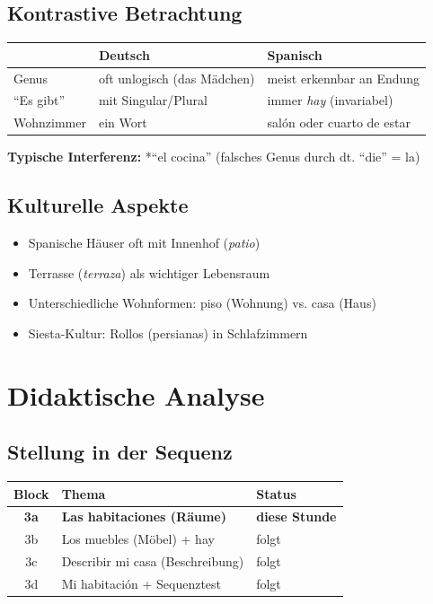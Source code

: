 \documentclass[11pt,a4paper]{article}
\begin{document}
\subsection{Kontrastive Betrachtung}

\begin{tabular}{|l|p{5cm}|p{5cm}|}
\hline
& \textbf{Deutsch} & \textbf{Spanisch} \\
\hline
Genus & oft unlogisch (das Mädchen) & meist erkennbar an Endung \\
\hline
``Es gibt'' & mit Singular/Plural & immer \textit{hay} (invariabel) \\
\hline
Wohnzimmer & ein Wort & salón oder cuarto de estar \\
\hline
\end{tabular}

\textbf{Typische Interferenz:} *``el cocina'' (falsches Genus durch dt. ``die'' = la)

\subsection{Kulturelle Aspekte}
\begin{itemize}
    \item Spanische Häuser oft mit Innenhof (\textit{patio})
    \item Terrasse (\textit{terraza}) als wichtiger Lebensraum
    \item Unterschiedliche Wohnformen: piso (Wohnung) vs. casa (Haus)
    \item Siesta-Kultur: Rollos (persianas) in Schlafzimmern
\end{itemize}

\section{Didaktische Analyse}

\subsection{Stellung in der Sequenz}
\begin{tabular}{|c|l|l|}
\hline
\textbf{Block} & \textbf{Thema} & \textbf{Status} \\
\hline
\textbf{3a} & \textbf{Las habitaciones (Räume)} & \textbf{diese Stunde} \\
3b & Los muebles (Möbel) + hay & folgt \\
3c & Describir mi casa (Beschreibung) & folgt \\
3d & Mi habitación + Sequenztest & folgt \\
\hline
\end{tabular}
\end{document}
